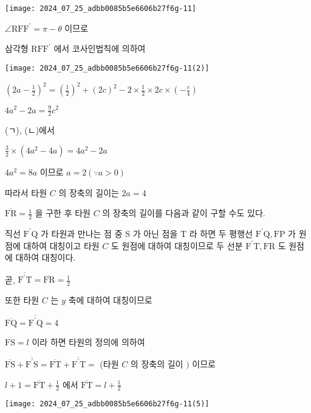 \documentclass[10pt]{article}
\begin{document}
\begin{center}
\texttt{[image: 2024\_07\_25\_adbb0085b5e6606b27f6g-11]}
\end{center}

$\angle \mathrm{RFF}^{\prime}=\pi-\theta$ 이므로

삼각형 $\mathrm{RFF}^{\prime}$ 에서 코사인법칙에 의하여

\begin{center}
\texttt{[image: 2024\_07\_25\_adbb0085b5e6606b27f6g-11(2)]}
\end{center}

$\left(2 a-\frac{1}{2}\right)^{2}=\left(\frac{1}{2}\right)^{2}+(2 c)^{2}-2 \times \frac{1}{2} \times 2 c \times\left(-\frac{c}{4}\right)$

$4 a^{2}-2 a=\frac{9}{2} c^{2}$

(ㄱ), (ㄴ)에서

$\frac{3}{2} \times\left(4 a^{2}-4 a\right)=4 a^{2}-2 a$

$4 a^{2}=8 a$ 이므로 $a=2(\because a>0)$

따라서 타원 $C$ 의 장축의 길이는 $2 a=4$

$\overline{\mathrm{FR}}=\frac{1}{2}$ 을 구한 후 타원 $C$ 의 장축의 길이를 다음과 같이 구할 수도 있다.

직선 $\mathrm{F}^{\prime} \mathrm{Q}$ 가 타원과 만나는 점 중 S 가 아닌 점을 T 라 하면 두 평행선 $\mathrm{F}^{\prime} \mathrm{Q}, \mathrm{FP}$ 가 원점에 대하여 대칭이고 타원 $C$ 도 원점에 대하여 대칭이므로 두 선분 $\mathrm{F}^{\prime} \mathrm{T}, \mathrm{FR}$ 도 원점에 대하여 대칭이다.

곧, $\overline{\mathrm{F}^{\prime} \mathrm{T}}=\overline{\mathrm{FR}}=\frac{1}{2}$

또한 타원 $C$ 는 $y$ 축에 대하여 대칭이므로

$\overline{\mathrm{FQ}}=\overline{\mathrm{F}^{\prime} \mathrm{Q}}=4$

$\overline{\mathrm{FS}}=l$ 이라 하면 타원의 정의에 의하여

$\overline{\mathrm{FS}}+\overline{\mathrm{F}^{\prime} \mathrm{S}}=\overline{\mathrm{FT}}+\overline{\mathrm{F}^{\prime} \mathrm{T}}=$ (타원 $C$ 의 장축의 길이 $)$ 이므로

$l+1=\overline{\mathrm{FT}}+\frac{1}{2}$ 에서 $\overline{\mathrm{FT}}=l+\frac{1}{2}$

\begin{center}
\texttt{[image: 2024\_07\_25\_adbb0085b5e6606b27f6g-11(5)]}
\end{center}
\end{document}
